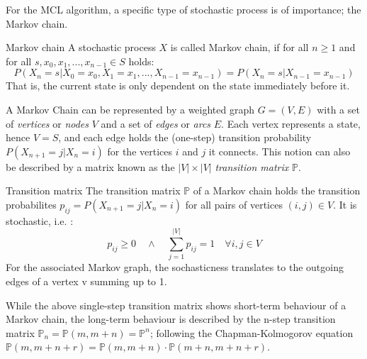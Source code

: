For the MCL algorithm, a specific type of stochastic process is of importance; the Markov chain.
\begin{definition}{Markov chain} A stochastic process $X$ is called Markov chain, if for all $n \geq 1$ and for all $s,x_0,x_1,...,x_{n-1} \in S$ holds:
\begin{equation}
P(X_n = s|X_0 = x_0, X_1 = x_1, ... , X_{n-1} = x_{n-1}) = P(X_n = s|X_{n-1} = x_{n-1})
\end{equation}
That is, the current state is only dependent on the state immediately before it.
\end{definition}
A Markov Chain can be represented by a weighted graph $G = (V,E)$ with a set of \textit{vertices} or \textit{nodes} $V$ and a set of \textit{edges} or \textit{arcs} $E$. Each vertex represents a state, hence $V = S$, and each edge holds the (one-step) transition probability $P(X_{n+1}=j|X_n=i)$ for the vertices $i$ and $j$ it connects. This notion can also be described by a matrix known as the $|V| \times |V|$ \textit{transition matrix} $\mathbb{P}$.
\begin{definition}{Transition matrix}
The transition matrix $\mathbb{P}$ of a Markov chain holds the transition probabilites $p_{ij} = P(X_{n+1}=j|X_n=i)$ for all pairs of vertices $(i,j) \in V$. It is stochastic, i.e. :
\begin{equation}
p_{ij} \geq 0 \quad \land \quad \sum_{j=1}^{|V|} p_{ij} = 1 \quad \forall i,j \in V
\end{equation}
For the associated Markov graph, the sochasticness translates to the outgoing edges of a vertex v summing up to 1.
\end{definition}
While the above single-step transition matrix shows short-term behaviour of a Markov chain, the long-term behaviour is described by the n-step transition matrix $\mathbb{P}_n = \mathbb{P}(m,m+n) = \mathbb{P}^n$; following the Chapman-Kolmogorov equation $\mathbb{P}(m,m+n+r) = \mathbb{P}(m,m+n)\cdot\mathbb{P}(m+n,m+n+r)$.
